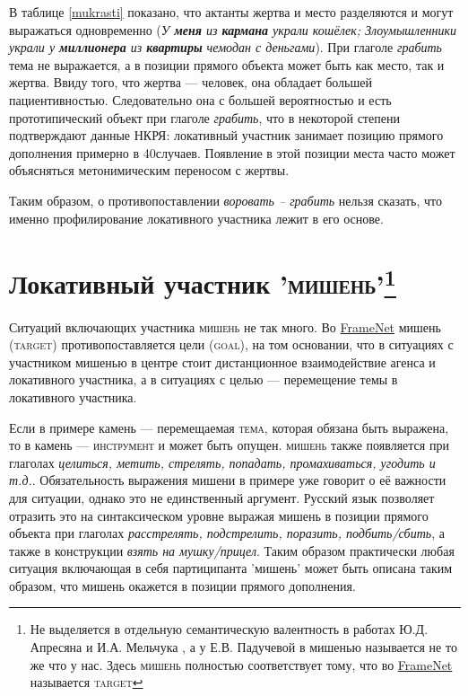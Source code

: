 В таблице \ref{mukrasti} показано, что актанты жертва и место разделяются и могут выражаться одновременно (\textit{У \textbf{меня} из \textbf{кармана} украли кошёлек; Злоумышленники украли у \textbf{миллионера} из \textbf{квартиры} чемодан с деньгами}). При глаголе \textit{грабить} тема не выражается, а в позиции прямого объекта может быть как место, так и жертва. Ввиду того, что жертва --- человек, она обладает большей пациентивностью. Следовательно она с большей вероятностью и есть прототипический объект при глаголе \textit{грабить}, что в некоторой степени подтверждают данные НКРЯ: локативный участник занимает позицию прямого дополнения примерно в 40\percent случаев. Появление в этой позиции места часто может объясняться метонимическим переносом с жертвы.

\par Таким образом, о противопоставлении \textit{воровать -- грабить} нельзя сказать, что именно профилирование локативного участника лежит в его основе.

\section[Локативный участник '\textsc{мишень}']{Локативный участник '\textsc{мишень}'\footnote{Не выделяется в отдельную семантическую валентность в работах Ю.Д. Апресяна и И.А. Мельчука \citep{апресян1995избранные2, mel2004actants},  а у Е.В. Падучевой в \citep{падучева2004динамические} мишенью называется не то же что у нас. Здесь \textsc{мишень} полностью соответствует тому, что во \hyperlink{fn}{FrameNet} называется \textsc{target}}}

Ситуаций включающих участника \textsc{мишень} не так много. Во \hyperlink{fn}{FrameNet} мишень (\textsc{target}) противопоставляется цели (\textsc{goal}), на том основании, что в ситуациях с участником мишенью в центре стоит дистанционное взаимодействие агенса и локативного участника, а в ситуациях с целью --- перемещение темы в локативного участника.


Если в примере  камень --- перемещаемая \textsc{тема}, которая обязана быть выражена, то в  камень --- \textsc{инструмент} и может быть опущен. \textsc{мишень} также появляется при глаголах \textit{целиться, метить, стрелять, попадать, промахиваться, угодить и т.д.}. Обязательность выражения мишени в примере  уже говорит о её важности для ситуации, однако это не единственный аргумент. Русский язык позволяет отразить это на синтаксическом уровне выражая мишень в позиции прямого объекта при глаголах \textit{расстрелять, подстрелить, поразить, подбить/сбить}, а также в конструкции \textit{взять на мушку/прицел}. Таким образом практически любая ситуация включающая в себя партиципанта 'мишень' может быть описана таким образом, что мишень окажется в позиции прямого дополнения.

